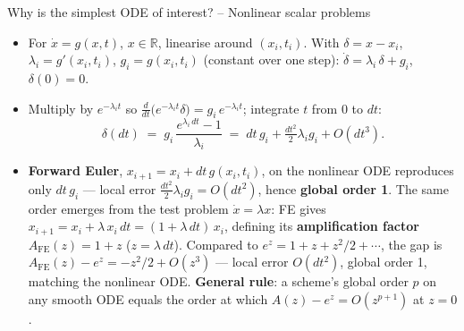\documentclass[11pt,aspectratio=169]{beamer}
\begin{document}
\begin{frame}{Why is the simplest ODE of interest? -- Nonlinear scalar problems}

\begin{itemize}

\item For $\dot x = g(x,t)$, $x\in\mathbb R$, linearise around
  $(x_i,t_i)$. With $\delta = x - x_i$, $\lambda_i = g'(x_i,t_i)$,
  $g_i = g(x_i,t_i)$ (constant over one step):
  $\dot\delta = \lambda_i\,\delta + g_i$, $\delta(0)=0$.\newline

\item Multiply by $e^{-\lambda_i t}$ so
  $\tfrac{d}{dt}\bigl(e^{-\lambda_i t}\delta\bigr) = g_i\,e^{-\lambda_i t}$;
  integrate $t$ from $0$ to $dt$:
  \[
  \delta(dt) \;=\; g_i\,\frac{e^{\lambda_i\, dt}-1}{\lambda_i}
  \;=\; dt\,g_i + \tfrac{dt^2}{2}\lambda_i g_i + O(dt^3).
  \]

\item \textbf{Forward Euler}, $x_{i+1} = x_i + dt\,g(x_i,t_i)$, on the
  nonlinear ODE reproduces only $dt\,g_i$ — local error
  $\tfrac{dt^2}{2}\lambda_i g_i = O(dt^2)$, hence \textbf{global order 1}.
  The same order emerges from the test problem $\dot x = \lambda x$:
  FE gives $x_{i+1} = x_i + \lambda\,x_i\,dt = (1+\lambda\,dt)\,x_i$, defining its
  \textbf{amplification factor} $A_{\mathrm{FE}}(z) = 1+z$ ($z = \lambda\,dt$).
  Compared to $e^z = 1+z+z^2/2+\cdots$, the gap is
  $A_{\mathrm{FE}}(z) - e^z = -z^2/2 + O(z^3)$ — local error $O(dt^2)$,
  global order 1, matching the nonlinear ODE. \textbf{General rule}:
  a scheme's global order $p$ on any smooth ODE equals the order at
  which $A(z) - e^z = O(z^{p+1})$ at $z=0$.

\end{itemize}

\end{frame}
\end{document}
